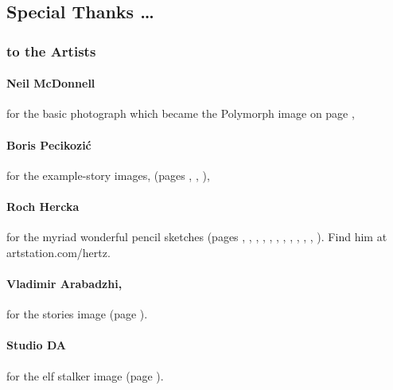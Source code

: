 \subsection*{Special Thanks \ldots}

\begin{multicols}{2}

\subsubsection*{to the Artists}

\paragraph{Neil McDonnell} for the basic photograph which became the Polymorph image on page \pageref{roch:polymorph},

\paragraph{Boris Pecikozi\'c} for the example-story images, (pages 
\pageref{Boris_Pecikozic/nura_jump}, 
\pageref{Boris_Pecikozic/nura_brawl}, 
\pageref{Boris_Pecikozic/dwarves_meet}), 

\paragraph{Roch Hercka} for the myriad wonderful pencil sketches (pages 
\pageref{Roch_Hercka/five_races}, 
\pageref{Roch_Hercka/dwarf_encumbrance}, 
\pageref{Roch_Hercka/stances}, 
\pageref{Roch_Hercka/vitals_shot}, 
\pageref{Roch_Hercka/xp-1}, 
\pageref{Roch_Hercka/xp-2}, 
\pageref{Roch_Hercka/elvish_enchanter}, 
\pageref{Roch_Hercka/conjuration_left}, 
\pageref{Roch_Hercka/polymorph}, 
\pageref{Roch_Hercka/dwarvish_runes}, 
\pageref{Roch_Hercka/illusion_trogdor}, 
\pageref{Roch_Hercka/flashing_light}
).
Find him at artstation.com/hertz.


\paragraph{Vladimir Arabadzhi,}
for the stories image (page \pageref{Vladimir_Arabadzhi/escape}).

\paragraph{Studio DA}
for the elf stalker image
(page \pageref{Studio_DA/elf_stalker}).


\end{multicols}
